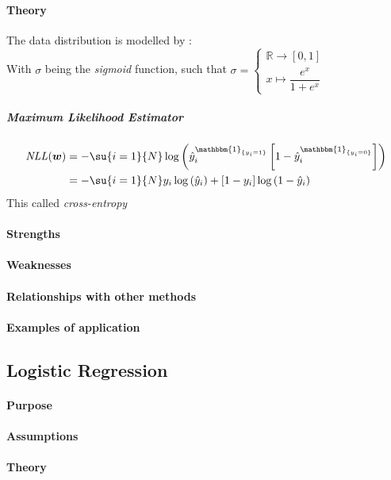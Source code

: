 \paragraph{Theory}
The data distribution is modelled by : 
\\
With $\sigma$ being the \emph{sigmoid} function, such that 
$\sigma = \begin{cases}
    \mathbb{R} \longrightarrow [0, 1]\\ 
    x \mapsto \dfrac{e^{x}}{1 + e^{x}}
\end{cases}
$
\subparagraph{Maximum Likelihood Estimator}
\begin{align*}
    \text{\emph{NLL}}(\bm{w})
    &= -\su{i=1}{N}\log\left(\hat{y}_{i}^{\mathbbm{1}_{\{y_{i} = 1\}}}\left[1 -
    \hat{y}_{i}^{\mathbbm{1}_{\{y_{i}=0\}}}\right]\right)\\ 
    &= -\su{i=1}{N}y_{i}\log\left(\hat{y}_{i}\right) + \left[1 -y_{i}\right]\log
    \left(1 -\hat{y}_{i}\right)
\end{align*}
This called \textit{cross-entropy}


\paragraph{Strengths}
\paragraph{Weaknesses}
\paragraph{Relationships with other methods}
\paragraph{Examples of application}

\subsection{Logistic Regression}
\paragraph{Purpose}
\paragraph{Assumptions}
\paragraph{Theory}
